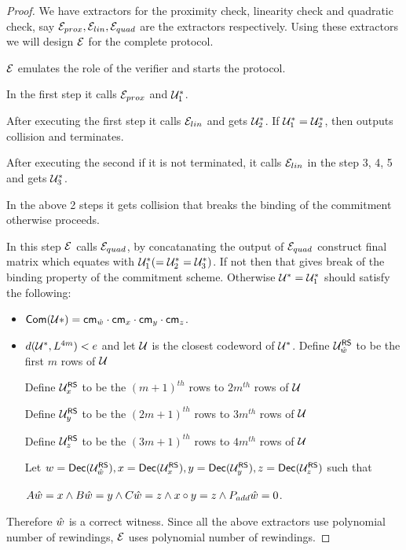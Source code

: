 \begin{proof}
	We have extractors for the proximity check, linearity check and quadratic check, say $\mathcal{E}_{prox}, \mathcal{E}_{lin}, \mathcal{E}_{quad}$ are the extractors respectively. Using these extractors we will design  $\mathcal{E}$ for the complete protocol. 
	
	$\mathcal{E}$ emulates the role of the verifier and starts the protocol. 
	
	In the first step it calls $\mathcal{E}_{prox}$ and $\mathcal{U}_1^*$.
	
	After executing the first step it calls $\mathcal{E}_{lin}$ and gets $\mathcal{U}_2^*$. If $\mathcal{U}_1^* = \mathcal{U}_2^*$, then outputs collision and terminates.
	
	After executing the second if it is not terminated, it calls $\mathcal{E}_{lin}$ in the step 3, 4, 5 and gets $\mathcal{U}_3^*$. 
	
	In the above 2 steps it gets collision that breaks the binding of the commitment otherwise proceeds.
	
	In this step $\mathcal{E}$ calls $\mathcal{E}_{quad}$, by concatanating the output of $\mathcal{E}_{quad}$ construct final matrix which equates with $\mathcal{U}_1^* (=\mathcal{U}_2^*=\mathcal{U}_3^*)$. If not then that gives break of the binding property of the commitment scheme. Otherwise $\mathcal{U}^*=\mathcal{U}_1^*$ should satisfy the following:
	\begin{itemize}
		\item $\mathsf{Com}(\mathcal{U}*)=\mathsf{cm}_{\hat{w}}\cdot\mathsf{cm}_x\cdot\mathsf{cm}_y\cdot\mathsf{cm}_z$.
		\item $d(\mathcal{U}^*,L^{4m}) < e$ and let $\mathcal{U}$ is the closest codeword of $\mathcal{U}^*$. Define $\mathcal{U}^{\mathsf{RS}}_{\hat{w}}$ to be the first $m$ rows of $\mathcal{U}$
		
		Define $\mathcal{U}^{\mathsf{RS}}_{x}$ to be the $(m+1)^{th}$ rows to $2m^{th}$ rows of $\mathcal{U}$
		
		Define $\mathcal{U}^{\mathsf{RS}}_{y}$ to be the $(2m+1)^{th}$ rows to $3m^{th}$ rows of $\mathcal{U}$
		
		Define $\mathcal{U}^{\mathsf{RS}}_{z}$ to be the $(3m+1)^{th}$ rows to $4m^{th}$ rows of $\mathcal{U}$
		
		Let $w= \mathsf{Dec}(\mathcal{U}^{\mathsf{RS}}_{\hat{w}}), x=\mathsf{Dec}(\mathcal{U}^{\mathsf{RS}}_x), y=\mathsf{Dec}(\mathcal{U}^{\mathsf{RS}}_y), z=\mathsf{Dec}(\mathcal{U}^{\mathsf{RS}}_z)$ such that
		
		$A\hat{w} = x \wedge B \hat{w} = y \wedge C \hat{w} = z \wedge x\circ y =z \wedge P_{add} \hat{w} = 0$.
	\end{itemize}
	Therefore $\hat{w}$ is a correct witness. Since all the above extractors use polynomial number of rewindings, $\mathcal{E}$ uses polynomial number of rewindings.		
\end{proof}

